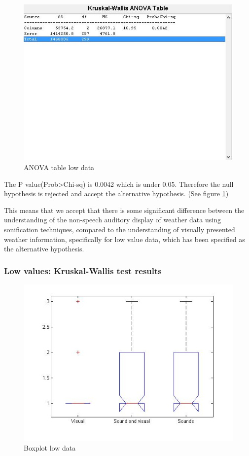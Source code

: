 \begin{figure}[!htbp]
    \centering
    \includegraphics[width=.7\textwidth]{images/Evaluation2.jpg}
    \caption{ANOVA table low data}
    \label{fig:evaluation2}
\end{figure}

The P value(Prob>Chi-sq) is 0.0042 which is under 0.05. Therefore the null hypothesis is rejected and accept the alternative hypothesis. (See figure \ref{fig:evaluation2})

This means that we accept that there is some significant difference between the understanding of the non-speech auditory display of weather data using sonification techniques, compared to the understanding of visually presented weather information, specifically for low value data, which has been specified as the alternative hypothesis.
\FloatBarrier


\subsubsection*{Low values: Kruskal-Wallis test results} %
\label{ssub:low_values_kruskal_wallis_test_results}

\begin{figure}[!htbp]
    \centering
    \includegraphics[width=.5\textwidth]{images/Evaluation3.jpg}
    \caption{Boxplot low data}
    \label{fig:evaluation3}
\end{figure}

